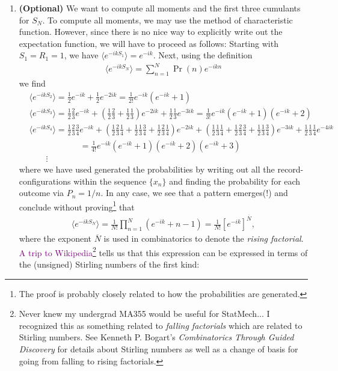 \documentclass{article}
\theoremstyle{definition}
\newcommand{\f}[2]{\frac{#1}{#2}}
\newcommand{\lp}{\left(}
\newcommand{\rp}{\right)}
\newcommand{\lb}{\left[}
\newcommand{\rb}{\right]}
\begin{document}
\begin{enumerate}[label=(\alph*)]
	
	\item \textbf{(Optional)} We want to compute all moments and the first three cumulants for $S_N$. To compute all moments, we may use the method of characteristic function. However, since there is no nice way to explicitly write out the expectation function, we will have to proceed as follows: Starting with $S_1 = R_1 = 1$, we have $\langle e^{-ik S_1}\rangle  = e^{-ik}$. Next, using the definition
	\begin{align*}
	\langle e^{-ik S_N} \rangle = \sum_{n=1}^N\Pr(n) e^{-ik n}
	\end{align*}
	we find 
	\begin{align*}
	&\langle e^{-ik S_2} \rangle = \f{1}{2}e^{-ik} + \f{1}{2}e^{-2ik} = \f{1}{2!}e^{-ik}(e^{-ik} + 1)\\
	&\langle e^{-ik S_3} \rangle = \f{1}{2}\f{2}{3} e^{-ik} + \lp \f{1}{2}\f{2}{3} + \f{1}{2}\f{1}{3}\rp e^{-2ik} + \f{1}{2}\f{1}{3}e^{-3ik} = \f{1}{3!}e^{-ik}(e^{-ik}+1)(e^{-ik}+2)\\
	&\langle e^{-ik S_4} \rangle = \f{1}{2}\f{2}{3}\f{3}{4} e^{-ik} + \lp \f{1}{2}\f{2}{3}\f{1}{4} + \f{1}{2}\f{1}{3}\f{3}{4} + \f{1}{2}\f{2}{3}\f{1}{4}\rp e^{-2ik} +\lp \f{1}{2}\f{1}{3}\f{1}{4}+\f{1}{2}\f{2}{3}\f{3}{4}  + \f{1}{2}\f{1}{3}\f{3}{4}\rp e^{-3ik} + \f{1}{2}\f{1}{3}\f{1}{4}e^{-4ik} \\
	&\quad\quad\quad\quad\quad\quad= \f{1}{4!}e^{-ik}(e^{-ik}+1)(e^{-ik}+2)(e^{-ik}+3)\\
	&\quad\quad\vdots
	\end{align*}
	where we have used generated the probabilities by writing out all the record-configurations within the sequence $\{ x_n\}$ and finding the probability for each outcome via $P_n = 1/n$. In any case, we see that a pattern emerges(!) and conclude without proving\footnote{The proof is probably closely related to how the probabilities are generated.} that 
	\begin{align*}
	\langle e^{-ik S_N} \rangle = \f{1}{N!} \prod_{n=1}^N (e^{-ik}+n-1) = \f{1}{N!} \lb e^{-ik}\rb^{\overline{N}},
	\end{align*}
	where the exponent $\overline{N}$ is used in combinatorics to denote the \textit{rising factorial}. \textcolor{purple}{A trip to Wikipedia\footnote{Never knew my undergrad MA355 would be useful for StatMech... I recognized this as something related to \textit{falling factorials} which are related to Stirling numbers. See Kenneth P. Bogart's \textit{Combinatorics Through Guided Discovery} for details about Stirling numbers as well as a change of basis for going from falling to rising factorials.}} tells us that this expression can be expressed in terms of the (unsigned) Stirling numbers of the first kind:

\end{enumerate}
\end{document}
